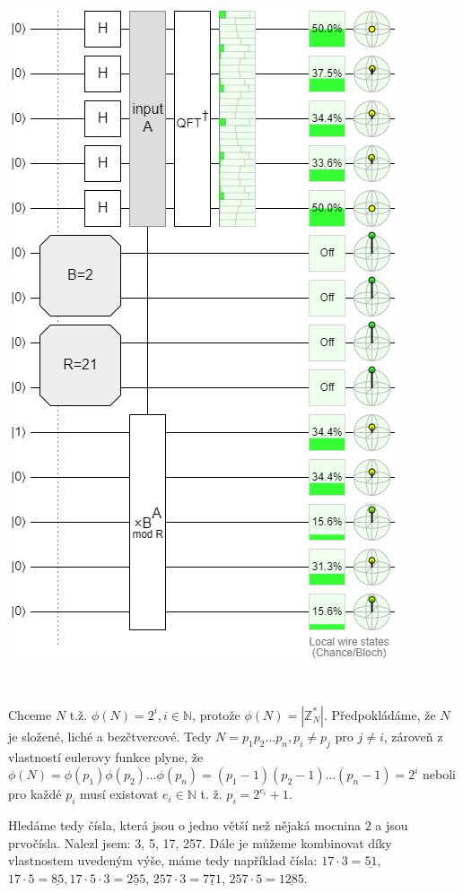 \documentclass[12pt, a4paper]{article}
\begin{document}
\begin{center}
\includegraphics{4/21.png}
\end{center}

\section{}
Chceme $N$ t.ž. $\phi(N)=2^i, i \in \mathbb{N}$, protože $\phi(N)=|\mathbb{Z}^*_N|$. Předpokládáme, že $N$ je složené, liché a bezčtvercové. Tedy $N = p_1p_2\dots p_n, p_i\neq p_j$ pro $j\neq i$, zároveň z vlastností eulerovy funkce plyne, že $\phi(N)=\phi(p_1)\phi(p_2)\dots \phi(p_n) = (p_1-1)(p_2-1)\dots (p_n-1)=2^i$ neboli pro každé $p_i$ musí existovat $e_i \in \mathbb{N}$ t. ž. $p_i = 2^{e_i} + 1$. 

Hledáme tedy čísla, která jsou o jedno větší než nějaká mocnina $2$ a jsou prvočísla. Nalezl jsem: 3, 5, 17, 257. Dále je můžeme kombinovat díky vlastnostem uvedeným výše, máme tedy například čísla: $17\cdot 3 = \underline{51}$, $17 \cdot 5 = \underline{85}, 17 \cdot 5 \cdot 3 = \underline{255}$, $257\cdot 3 = \underline{771}$, $257 \cdot 5 = \underline{1285}$.
\end{document}

